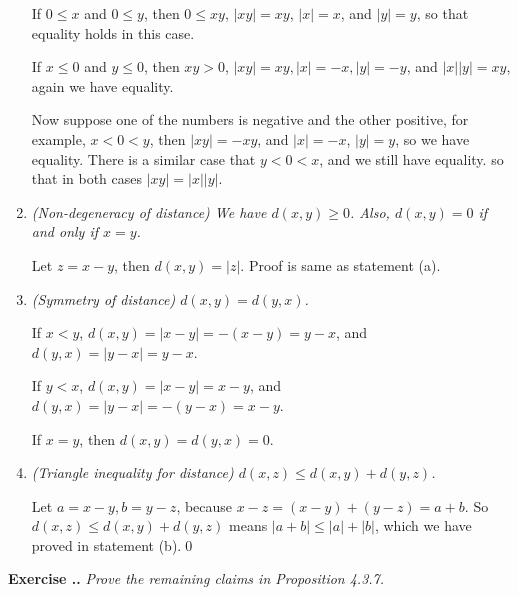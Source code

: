 \documentclass{book}
\newcounter{Exercise}[section]
\renewcommand{\theExercise}{\thesection.\arabic{Exercise}.}
\newcommand{\new}{\vspace{1.5em}\noindent\textbf{{Exercise \stepcounter{Exercise}\textbf{\theExercise}}} }
\begin{document}
\begin{enumerate}
    If $0\leq x$ and $0\leq y$, then $0\leq xy$, $|xy|=xy$, $|x|=x$, and $|y|=y$, so that equality holds in this case.

    If $x\leq0$ and $y\leq0$, then $xy>0$, $|xy|=xy,|x|=-x,|y|=-y$, and $|x||y|=xy$, again we have equality.

    Now suppose one of the numbers is negative and the other positive, for example, $x<0<y$, then $|xy|=-xy$, and $|x|=-x$, $|y|=y$, so we have equality. There is a similar case that $y<0<x$, and we still have equality. so that in both cases $|xy|=|x||y|$.

    \item \emph{(Non-degeneracy of distance) We have $d(x,y)\geq 0$. Also, $d(x,y)=0$ if and only if $x=y$.}

    Let $z=x-y$, then $d(x,y)=|z|$. Proof is same as statement (a).

    \item \emph{(Symmetry of distance) $d(x,y)=d(y,x)$.}

    If $x<y$, $d(x,y)=|x-y|=-(x-y)=y-x$, and $d(y,x)=|y-x|=y-x$.

    If $y<x$, $d(x,y)=|x-y|=x-y$, and $d(y,x)=|y-x|=-(y-x)=x-y$.

    If $x=y$, then $d(x,y)=d(y,x)=0$.

    \item \emph{(Triangle inequality for distance) $d(x,z)\leq d(x,y)+d(y,z)$.}

    Let $a=x-y,b=y-z$, because $x-z=(x-y)+(y-z)=a+b$. So $d(x,z)\leq d(x,y)+d(y,z)$ means $|a+b|\leq|a|+|b|$, which we have proved in statement (b).\qed
\end{enumerate}

\new\emph{Prove the remaining claims in Proposition 4.3.7.}
\end{document}
